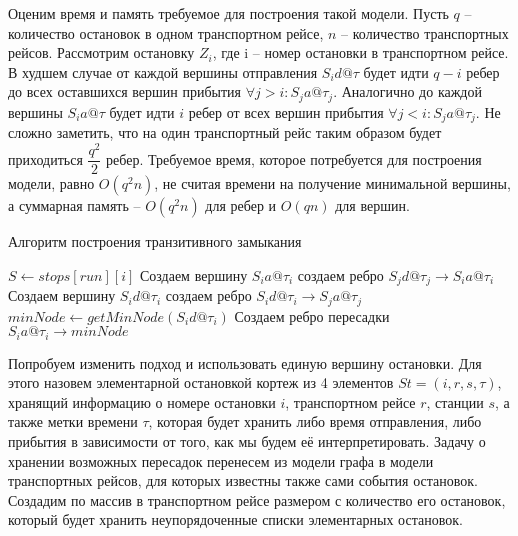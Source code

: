 Оценим время и память требуемое для построения такой модели. Пусть $q$ -- количество остановок в одном транспортном рейсе, $n$ -- количество транспортных рейсов. Рассмотрим остановку $Z_i$, где i -- номер остановки в транспортном рейсе. В худшем случае от каждой вершины отправления $S_id@\tau$ будет идти $q-i$ ребер до всех оставшихся вершин прибытия $\forall j > i : S_ja@\tau_j$. Аналогично до каждой вершины $S_ia@\tau$ будет идти $i$ ребер от всех вершин прибытия $\forall j < i : S_ja@\tau_j$. Не сложно заметить, что на один транспортный рейс таким образом будет приходиться $\dfrac{q^2}{2}$ ребер. Требуемое время, которое потребуется для построения модели, равно $O(q^2n)$, не считая времени на получение минимальной вершины, а суммарная память -- $O(q^2n)$ для ребер и $O(qn)$ для вершин.

\begin{algorithm}[!h]
	\caption{Алгоритм построения транзитивного замыкания}\label{lst3}
	\begin{algorithmic}
		\State $S \gets stops[run][i]$ 
		\State Создаем вершину $S_ia@\tau_i$
		\State создаем ребро $S_jd@\tau_j \rightarrow S_ia@\tau_i$
		\EndFor
		\State Создаем вершину $S_id@\tau_i$
		\State создаем ребро $S_id@\tau_i \rightarrow S_ja@\tau_j$
		\EndFor
		\State $minNode \gets getMinNode(S_id@\tau_i)$ 
		\State Создаем ребро пересадки $S_ia@\tau_i \rightarrow minNode$
		\EndFor
		\EndFor
		\EndFunction
	\end{algorithmic}
\end{algorithm}
\FloatBarrier 

Попробуем изменить подход и использовать единую вершину остановки. Для этого назовем элементарной остановкой кортеж из 4 элементов $St=(i, r, s, \tau)$, хранящий информацию о номере остановки $i$, транспортном рейсе $r$, станции $s$, а также метки времени $\tau$, которая будет хранить либо время отправления, либо прибытия в зависимости от того, как мы будем её интерпретировать. Задачу о хранении возможных пересадок перенесем из модели графа в модели транспортных рейсов, для которых известны также сами события остановок. Создадим по массив в транспортном рейсе размером с количество его остановок, который будет хранить неупорядоченные списки элементарных остановок.

